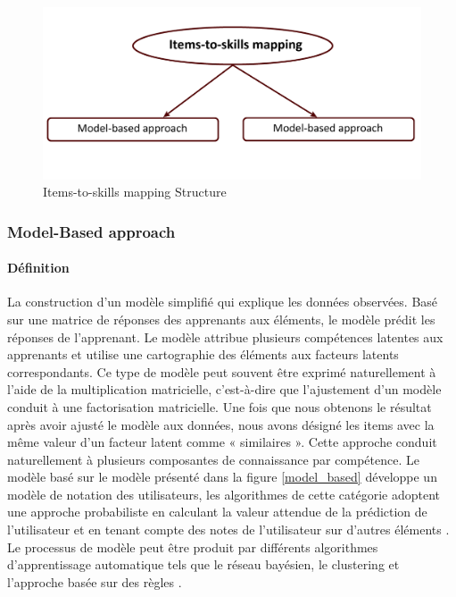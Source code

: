 \begin{figure}[H]
	\begin{center}
		\includegraphics[width=\textwidth]{images/chapitre3/Items_to_skills_mappin_structure.png}
	\end{center}
\caption{Items-to-skills mapping Structure}
\label{items_to_skills_mapping}
\end{figure}

\subsubsection{Model-Based approach}
\paragraph{Définition}
La construction d'un modèle simplifié qui explique les données observées. Basé sur une matrice de réponses des apprenants aux éléments, le modèle prédit les réponses de l'apprenant. Le modèle attribue plusieurs compétences latentes aux apprenants et utilise une cartographie des éléments aux facteurs latents correspondants. Ce type de modèle peut souvent être exprimé naturellement à l'aide de la multiplication matricielle, c'est-à-dire que l'ajustement d'un modèle conduit à une factorisation matricielle. Une fois que nous obtenons le résultat après avoir ajusté le modèle aux données, nous avons désigné les items avec la même valeur d'un facteur latent comme « similaires ». Cette approche conduit naturellement à plusieurs composantes de connaissance par compétence. \cite{pelanek2018measuring} Le modèle basé sur le modèle présenté dans la figure \ref{model_based} développe un modèle de notation des utilisateurs, les algorithmes de cette catégorie adoptent une approche probabiliste en calculant la valeur attendue de la prédiction de l'utilisateur et en tenant compte des notes de l'utilisateur sur d'autres éléments \cite{item_based_recommendation_algo}. \\
Le processus de modèle peut être produit par différents algorithmes d'apprentissage automatique tels que le réseau bayésien, le clustering et l'approche basée sur des règles \cite{breese2013empirical}.

